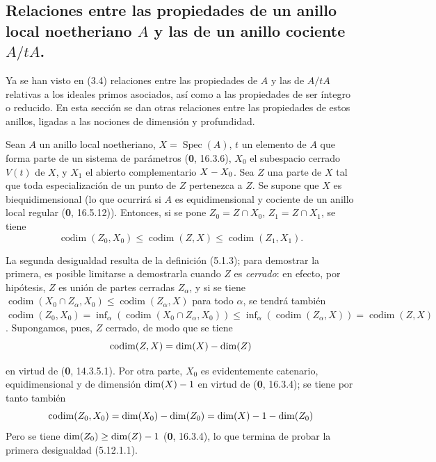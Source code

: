 \subsection{\texorpdfstring{Relaciones entre las propiedades de un anillo local noetheriano $A$ y
las de un anillo cociente $A/tA$.}{Relaciones entre las propiedades de un anillo local noetheriano A y las de un anillo cociente A/tA}}

Ya se han visto en (3.4) relaciones entre las propiedades de $A$ y las de $A/tA$
relativas a los ideales primos asociados, así como a las propiedades de ser
íntegro o reducido. En esta sección se dan otras relaciones entre las
propiedades de estos anillos, ligadas a las nociones de dimensión y profundidad.

\begin{proposition}[5.12.1]
\label{IV.2.s5.12.1-fr}
Sean $A$ un anillo local noetheriano, $X=\operatorname{Spec}(A)$, $t$ un
elemento de $A$ que forma parte de un sistema de parámetros \textup{(\textbf 0, 16.3.6)}, $X_0$
el subespacio cerrado $V(t)$ de $X$, y $X_1$ el abierto complementario
$X- X_0$. Sea $Z$ una parte de $X$ tal que toda especialización de un punto de
$Z$ pertenezca a $Z$. Se supone que $X$ es biequidimensional \textup{(lo que ocurrirá
si $A$ es equidimensional y cociente de un anillo local regular (\textbf{0}, 16.5.12))}.
Entonces, si se pone $Z_0=Z\cap X_0$, $Z_1=Z\cap X_1$, se tiene
\begin{equation}
\operatorname{codim}(Z_0,X_0)\leq\operatorname{codim}(Z,X)
\leq\operatorname{codim}(Z_1,X_1).
\tag{5.12.1.1}\label{IV.2.s5.12.1.1-fr}
\end{equation}
\end{proposition}

La segunda desigualdad resulta de la definición (5.1.3); para demostrar la
primera, es posible limitarse a demostrarla cuando $Z$ es \emph{cerrado}: en efecto, por
hipótesis, $Z$ es unión de partes cerradas $Z_\alpha$, y si se tiene
$\operatorname{codim}(X_0\cap Z_\alpha,X_0)
\leq\operatorname{codim}(Z_\alpha,X)$ para todo $\alpha$, se tendrá también
$\operatorname{codim}(Z_0,X_0)
=\inf_\alpha(\operatorname{codim}(X_0\cap Z_\alpha,X_0))
\leq\inf_\alpha(\operatorname{codim}(Z_\alpha,X))
=\operatorname{codim}(Z,X)$.
Supongamos, pues, $Z$ cerrado, de modo que se tiene
\[
\operatorname{codim}(Z,X)=\dim(X)-\dim(Z)
\]


en virtud de (\textbf 0, 14.3.5.1). Por otra parte, $X_0$ es evidentemente catenario,
equidimensional y de dimensión $\dim(X)- 1$ en virtud de (\textbf 0, 16.3.4); se tiene
por tanto también
\[
\operatorname{codim}(Z_0,X_0)=\dim(X_0)-\dim(Z_0)
=\dim(X)- 1-\dim(Z_0)
\]
Pero se tiene $\dim(Z_0)\geq\dim(Z)- 1$ (\textbf 0, 16.3.4), lo que termina de probar la
primera desigualdad (5.12.1.1).

